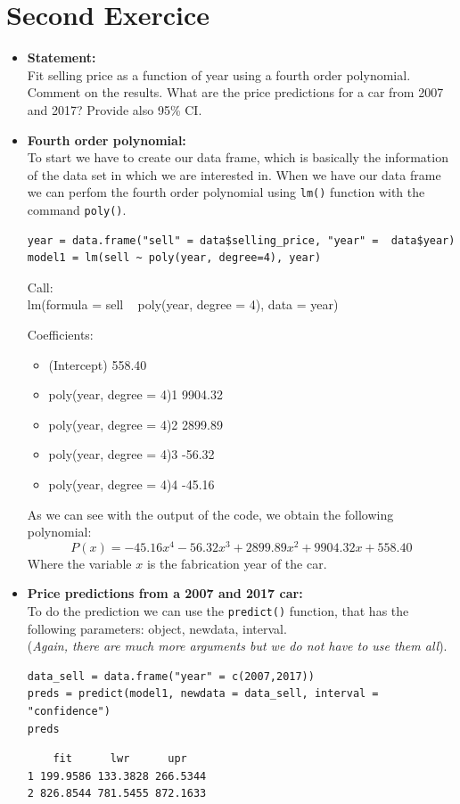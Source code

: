 \documentclass{article}
\begin{document}
\newpage


\section{Second Exercice}
\begin{itemize}
    \item \textbf{Statement:}\\ 
Fit selling price as a function of year using a fourth order polynomial.
Comment on the results. What are the price predictions for a car from
2007 and 2017? Provide also 95\% CI.
    \item \textbf{Fourth order polynomial:} \\ 
To start we have to create our data frame, which is basically the information of the data set in which we are interested in.
When we have our data frame we can perfom the fourth order polynomial using \texttt{lm()} function with the command \texttt{poly()}.
    \begin{verbatim}
year = data.frame("sell" = data$selling_price, "year" =  data$year)
model1 = lm(sell ~ poly(year, degree=4), year)
    \end{verbatim}
Call:\\
lm(formula = sell ~ poly(year, degree = 4), data = year)

Coefficients:
\begin{itemize}
    \item (Intercept)  558.40
    \item poly(year, degree = 4)1  9904.32 
    \item poly(year, degree = 4)2  2899.89 
    \item poly(year, degree = 4)3  -56.32
    \item poly(year, degree = 4)4   -45.16
\end{itemize}
            
                                   

As we can see with the output of the code, we obtain the following polynomial: 
\begin{equation*}
    P(x) = - 45.16x^4 - 56.32x^3 + 2899.89x^2 + 9904.32x + 558.40
\end{equation*}
Where the variable $x$ is the fabrication year of the car.
    \item \textbf{Price predictions from a 2007 and 2017 car:} \\ To do the prediction we can use the \texttt{predict()} function, that has the following parameters: object, newdata, interval. \\
    (\textit{Again, there are much more arguments but we do not have to use them all}).
    \begin{verbatim}
data_sell = data.frame("year" = c(2007,2017))
preds = predict(model1, newdata = data_sell, interval = "confidence")
preds
    \end{verbatim}
    \begin{verbatim}
    fit      lwr      upr
1 199.9586 133.3828 266.5344
2 826.8544 781.5455 872.1633
    \end{verbatim} 
    

\end{itemize}
\end{document}
